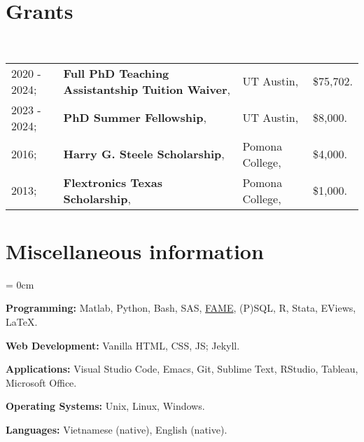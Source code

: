 \documentclass[a4paper, 10pt]{article}
\begin{document}
  \section{Grants}
  ~\begin{tabular}{llll}
    2020 - 2024; & \textbf{Full PhD Teaching Assistantship Tuition Waiver}, & UT Austin, & \$75,702.\\
    2023 - 2024; & \textbf{PhD Summer Fellowship}, & UT Austin, & \$8,000.\\
    2016; & \textbf{Harry G. Steele Scholarship}, & Pomona College, & \$4,000.\\
    2013; & \textbf{Flextronics Texas Scholarship}, & Pomona College, & \$1,000.
  \end{tabular}
  \vspace*{0.25em}
    
  \section{Miscellaneous information}
  \begin{compactitem}\parskip = 0cm
    \item \textbf{Programming:} Matlab, Python, Bash, SAS, \href{https://en.wikipedia.org/wiki/FAME_(database)}{FAME}, (P)SQL, R, Stata, EViews, \LaTeX.
    \item \textbf{Web Development:} Vanilla HTML, CSS, JS; Jekyll.
    \item \textbf{Applications:} Visual Studio Code, Emacs, Git, Sublime Text, RStudio, Tableau, Microsoft Office.
    \item \textbf{Operating Systems:} Unix, Linux, Windows.
    \item \textbf{Languages:} Vietnamese (native), English (native).
  \end{compactitem}
\end{document}
